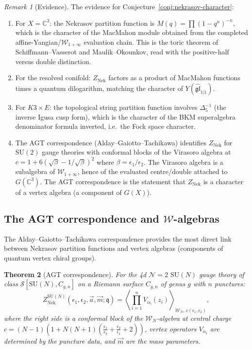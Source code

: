 \documentclass[11pt]{article}
\newtheorem{theorem}{Theorem}[section]
\theoremstyle{definition}
\theoremstyle{remark}
\newtheorem{remark}[theorem]{Remark}
\newcommand{\cN}{\mathcal{N}}
\newcommand{\cW}{\mathcal{W}}
\newcommand{\Nek}{\mathrm{Nek}}
\newcommand{\SU}{\mathrm{SU}}
\begin{document}
\begin{remark}[Evidence]
 \label{rem:nekrasov-evidence}
 The evidence for Conjecture~\ref{conj:nekrasov-character}:
 \begin{enumerate}[label=(\arabic*),nosep]
 \item For $X = \mathbb{C}^3$: the Nekrasov partition function is $M(q) = \prod (1-q^n)^{-n}$,
 which is the character of the MacMahon module obtained from the completed affine-Yangian/$\cW_{1+\infty}$ evaluation chain. This is the toric theorem of Schiffmann--Vasserot and Maulik--Okounkov, read with the positive-half versus double distinction.
 \item For the resolved conifold: $Z_{\Nek}$ factors as a product of MacMahon functions times
 a quantum dilogarithm, matching the character of $Y(\widehat{\mathfrak{gl}}_{1|1})$.
 \item For $K3 \times E$: the topological string partition function involves $\Delta_5^{-1}$
 (the inverse Igusa cusp form), which is the character of the BKM superalgebra denominator
 formula inverted, i.e.\ the Fock space character.
 \item The AGT correspondence (Alday--Gaiotto--Tachikawa) identifies $Z_{\Nek}$ for
 $\SU(2)$ gauge theories with conformal blocks of the Virasoro algebra at $c = 1 + 6(\sqrt{\beta}
 - 1/\sqrt{\beta})^2$ where $\beta = \epsilon_1/\epsilon_2$. The Virasoro algebra is a subalgebra
 of $\cW_{1+\infty}$, hence of the evaluated centre/double attached to $G(\mathbb{C}^3)$. The AGT correspondence is the statement
 that $Z_{\Nek}$ is a character of a vertex algebra (a component of $G(X)$).
 \end{enumerate}
\end{remark}

\subsection{The AGT correspondence and $\cW$-algebras}
\label{subsec:agt}

The Alday--Gaiotto--Tachikawa correspondence provides the most direct link between Nekrasov
partition functions and vertex algebras (components of quantum vertex chiral groups).

\begin{theorem}[AGT correspondence]
 \label{thm:agt}
 For the 4d $\cN=2$ $\SU(N)$ gauge theory of class $\mathcal{S}[\SU(N), C_{g,n}]$ on a
 Riemann surface $C_{g,n}$ of genus $g$ with $n$ punctures:
 \begin{equation}
 \label{eq:agt}
 Z_{\Nek}^{\SU(N)}(\epsilon_1, \epsilon_2, \vec{a}, \vec{m}; \mathfrak{q}) = \left\langle \prod_{i=1}^n V_{\alpha_i}(z_i) \right\rangle_{\cW_N,\, c(\epsilon_1,\epsilon_2)},
 \end{equation}
 where the right side is a conformal block of the $\cW_N$-algebra at central charge $c =
 (N-1)\left(1 + N(N+1)\left(\frac{\epsilon_1}{\epsilon_2} + \frac{\epsilon_2}{\epsilon_1} + 2\right)\right)$,
 vertex operators $V_{\alpha_i}$ are determined by the puncture data, and $\vec{m}$ are the mass
 parameters.
\end{theorem}
\end{document}
